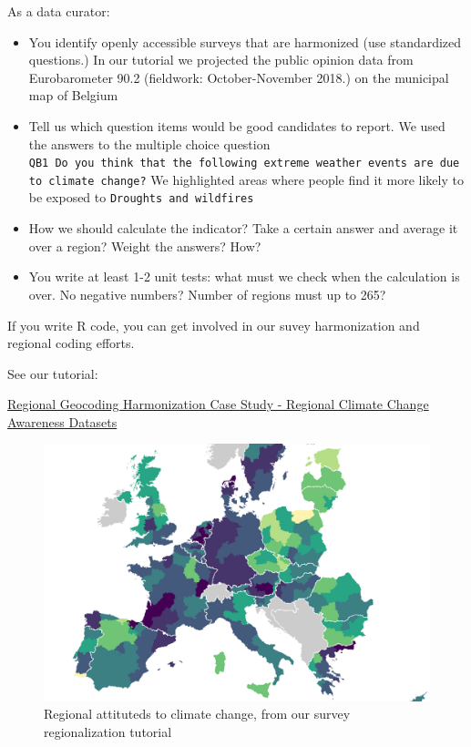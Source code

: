 \documentclass[
  a4paper,
  openany, a4paper, oneside]{book}
\providecommand{\tightlist}{%
  \setlength{\itemsep}{0pt}\setlength{\parskip}{0pt}}
\begin{document}
As a data curator:

\begin{itemize}
\tightlist
\item
  You identify openly accessible surveys that are harmonized (use standardized questions.) In our tutorial we projected the public opinion data from Eurobarometer 90.2 (fieldwork: October-November 2018.) on the municipal map of Belgium
\item
  Tell us which question items would be good candidates to report. We used the answers to the multiple choice question \texttt{QB1\ Do\ you\ think\ that\ the\ following\ extreme\ weather\ events\ are\ due\ to\ climate\ change?} We highlighted areas where people find it more likely to be exposed to \texttt{Droughts\ and\ wildfires}
\item
  How we should calculate the indicator? Take a certain answer and average it over a region? Weight the answers? How?
\item
  You write at least 1-2 unit tests: what must we check when the calculation is over. No negative numbers? Number of regions must up to 265?
\end{itemize}

If you write R code, you can get involved in our suvey harmonization and regional coding efforts.

See our tutorial:

\href{http://greendeal.dataobservatory.eu/post/2021-03-06-regions-climate/}{Regional Geocoding Harmonization Case Study - Regional Climate Change Awareness Datasets}

\begin{figure}

{\centering \includegraphics[width=0.67\linewidth]{plots/eurobarometer_climate_attitude_tutorial} 

}

\caption{Regional attituteds to climate change, from our survey regionalization tutorial}\label{fig:regional-climate-attitutes-tutorial}
\end{figure}
\end{document}
